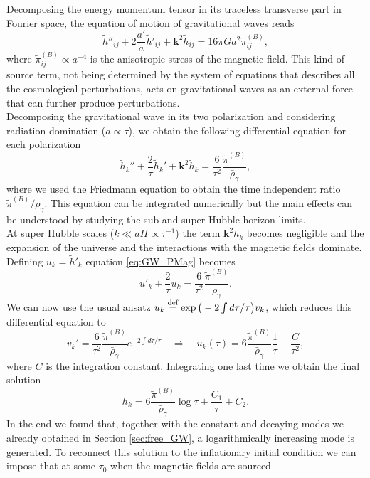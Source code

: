 Decomposing the energy momentum tensor in its traceless transverse part in Fourier space, the equation of motion of gravitational waves reads  
\begin{equation*}
     \tilde h''_{ij}+2\frac{a'}{a}\tilde h'_{ij}+\boldsymbol{k}^2 \tilde h_{ij}=16\pi G a^2\tilde\pi^{(B)}_{ij},
\end{equation*}
where $\tilde\pi^{(B)}_{ij}\propto a^{-4}$ is the anisotropic stress of the magnetic field. This kind of source term, not being determined by the system of equations that describes all the cosmological perturbations, acts on gravitational waves as an external force that can further produce perturbations.\\Decomposing the gravitational wave in its two polarization and considering radiation domination ($a \propto\tau$), we obtain the following differential equation for each polarization
\begin{equation}\label{eq:GW_PMag}
\tilde h_k''+\frac{2}{\tau}\tilde h_k'+\mathbf k^2\tilde h_k=\frac{6}{\tau^2}\frac{\tilde\pi^{(B)}}{\bar \rho_\gamma},
\end{equation}
where we used the Friedmann equation to obtain the time independent ratio $\tilde\pi^{(B)}/\bar\rho_\gamma$. This equation can be integrated numerically but the main effects can be understood by studying the sub and super Hubble horizon limits.\\ At super Hubble scales ($k\ll aH\propto\tau^{-1}$) the term $\mathbf k^2\tilde h_k$ becomes negligible and the expansion of the universe and the interactions with the magnetic fields dominate. Defining $u_k=\tilde h'_k$ equation \eqref{eq:GW_PMag} becomes
$$u'_k+\frac{2}{\tau}u_k=\frac{6}{\tau^2}\frac{\tilde\pi^{(B)}}{\bar\rho_\gamma}.$$
We can now use the usual ansatz $u_k\stackrel{\text{def}}{=}\exp\big(-2\int d\tau/\tau\big)v_k$, which reduces this differential equation to 
$$v_k'=\frac{6}{\tau^2}\frac{\tilde\pi^{(B)}}{\bar\rho_\gamma}e^{-2\int d\tau/\tau}\quad \Rightarrow\quad u_k(\tau)=6\frac{\tilde\pi^{(B)}}{\bar\rho_\gamma}\frac{1}{\tau}-\frac{C}{\tau^2},$$
where $C$ is the integration constant. Integrating one last time we obtain the final solution 
\begin{equation}
    \tilde h_k=6\frac{\tilde\pi^{(B)}}{\bar\rho_\gamma}\log\tau+\frac{C_1}{\tau} + C_2. \label{eq:SH_PM_PGWs}
\end{equation}
In the end we found that, together with the constant and decaying modes we already obtained in Section \ref{sec:free_GW}, a logarithmically increasing mode is generated. To reconnect this solution to the inflationary initial condition we can impose that at some $\tau_0$ when the magnetic fields are sourced 
